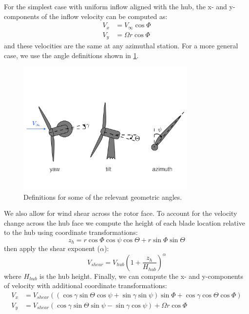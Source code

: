 \documentclass{article}
\begin{document}
For the simplest case with uniform inflow aligned with the hub, the x- and y-components of the inflow velocity can be computed as:
\begin{equation}
\begin{aligned}
    V_x &= V_\infty \cos\Phi\\
    V_y &= \Omega r \cos\Phi
\end{aligned}
\end{equation}
and these velocities are the same at any azimuthal station.  For a more general case, we use the angle definitions shown in \cref{fig:angles}.
\begin{figure}[htbp]
\centering
\includegraphics[width=3.5in]{figures/angles}
\caption{Definitions for some of the relevant geometric angles.}
\label{fig:angles}
\end{figure}
We also allow for wind shear across the rotor face.  To account for the velocity change across the hub face we compute the height of each blade location relative to the hub using coordinate transformations:
\begin{equation}
    z_h = r \cos\Phi \cos\psi \cos\Theta + r \sin\Phi\sin\Theta
\end{equation}
then apply the shear exponent ($\alpha$):
\begin{equation}
    V_{shear} = V_{hub} \left(1 + \frac{z_h}{H_{hub}} \right)^\alpha
\end{equation}
where $H_{hub}$ is the hub height.  Finally, we can compute the x- and y-components of velocity with additional coordinate transformations:
\begin{equation}
\begin{aligned}
V_x &= V_{shear} ((\cos \gamma \sin \Theta \cos \psi + \sin \gamma \sin \psi)\sin \Phi + \cos \gamma \cos \Theta \cos \Phi)\\
V_y &= V_{shear} (\cos \gamma \sin \Theta\sin \psi - \sin \gamma \cos \psi) + \Omega r \cos\Phi
\end{aligned}
\end{equation}
\end{document}
